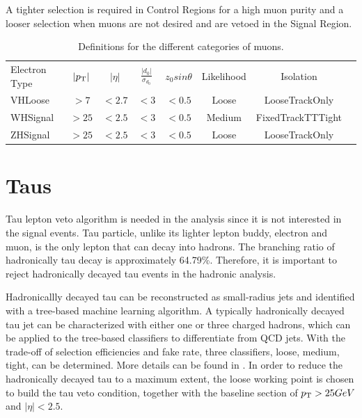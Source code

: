 A tighter selection is required in Control Regions for a high muon purity and a looser selection when muons are not desired and are vetoed in the Signal Region.
\begin{table}[tbh]
\centering
\begin{tabular}{|l|c|c|c|c|c|c|c}

\hline
Electron Type & $|p_{\mathrm{T}}|$ &$|\eta|$ & $\frac{|d_0|}{\sigma_{d_0}}$&$z_0 sin\theta$ & Likelihood &Isolation \\
VHLoose &$>7$&$<2.7$&$<3$&$<0.5$&Loose&LooseTrackOnly\\
WHSignal &$>25$&$<2.5$&$<3$&$<0.5$&Medium&FixedTrackTTTight\\
ZHSignal &$>25$&$<2.5$&$<3$&$<0.5$&Loose&LooseTrackOnly\\
\hline
\end{tabular}
\caption{Definitions for the different categories of muons.}
 \label{tab:mu}
\end{table}


\section{Taus}
\label{sec:taus}
\par Tau lepton veto algorithm is needed in the analysis since it is not interested in the signal events. Tau particle, unlike its lighter lepton buddy, electron and muon, is the only lepton that can decay into hadrons. The branching ratio of hadronically tau decay is approximately 64.79\%. Therefore, it is important to reject hadronically decayed tau events in the hadronic analysis.

\par Hadronicallly decayed tau can be reconstructed as small-radius jets and identified with a tree-based machine learning algorithm. A typically hadronically decayed tau jet can be characterized with either one or three charged hadrons, which can be applied to the tree-based classifiers to differentiate from QCD jets. With the trade-off of selection efficiencies and fake rate, three classifiers, loose, medium, tight, can be determined. More details can be found in \cite{ATL-PHYS-PUB-2015-045}. In order to reduce the hadronically decayed tau to a maximum extent, the loose working point is chosen to build the tau veto condition, together with the baseline section of $p_{\mathrm{T}} > 25 GeV$ and $|\eta| < 2.5$.

